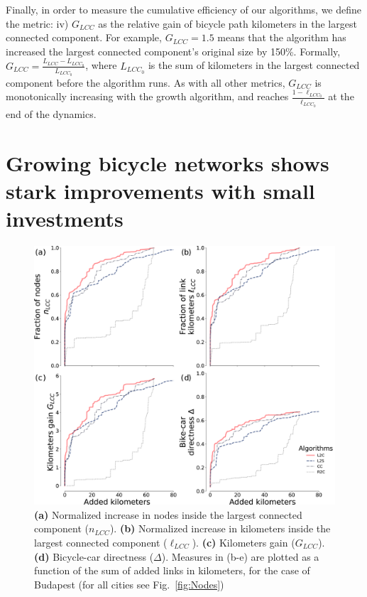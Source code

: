 Finally, in order to measure the cumulative efficiency of our algorithms, we define the metric: iv) $G_{LCC}$ as the relative gain of bicycle path kilometers in the largest connected component. For example, $G_{LCC}=1.5$ means that the algorithm has increased the largest connected component's original size by 150\%. Formally, $G_{LCC}=\frac{L_{LCC}-L_{LCC_0}}{L_{LCC_0}}$, where $L_{LCC_0}$ is the sum of kilometers in the largest connected component before the algorithm runs. As with all other metrics, $G_{LCC}$ is monotonically increasing with the growth algorithm, and reaches $\frac{1-\ell_{LCC_0}}{\ell_{LCC_0}}$ at the end of the dynamics.

\section{Growing bicycle networks shows stark improvements with small investments}

\begin{figure}[th!]
  \centering
  \includegraphics[width=\textwidth]{images/datadriven/BPincrease.png}
  \caption[Algorithmic improvement in Budapest]{\textbf{(a)} Normalized increase in nodes inside the largest connected component ($n_{LCC}$). \textbf{(b)} Normalized increase in kilometers inside the largest connected component ($\ell_{LCC}$). \textbf{(c)} Kilometers gain ($G_{LCC}$). \textbf{(d)} Bicycle-car directness ($\Delta$). Measures in (b-e) are plotted as a function of the sum of added links in kilometers, for the case of Budapest (for all cities see Fig.~\ref{fig:Nodes})}
  \label{fig:ImprovementBP}
\end{figure}

